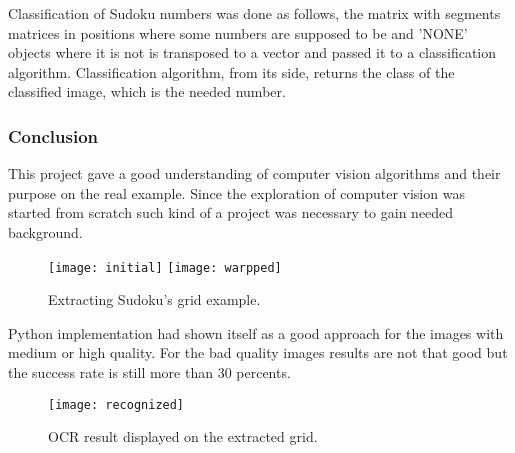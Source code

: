 \documentclass[../../main]{subfiles}
\begin{document}
Classification of Sudoku numbers was done as follows, the matrix with segments matrices in positions where some numbers are supposed to be and 'NONE' objects where it is not is transposed to a vector and passed it to a classification algorithm. Classification algorithm, from its side, returns the class of the classified image, which is the needed number.

\subsubsection{Conclusion}

This project gave a good understanding of computer vision algorithms and their purpose on the real example. Since the exploration of computer vision was started from scratch such kind of a project was necessary to gain needed background. 

\begin{figure} [ht!]
    \begin{center}
        \texttt{[image: initial]}
        \texttt{[image: warpped]}
        \caption{Extracting Sudoku's grid example.}
        \label{fig:sudoku_extraction}
    \end{center}
\end{figure}

Python implementation had shown itself as a good approach for the images with medium or high quality. For the bad quality images results are not that good but the success rate is still more than 30 percents.

\begin{figure} [ht!]
    \begin{center}
        \texttt{[image: recognized]}
        \caption{OCR result displayed on the extracted grid.}
        \label{fig:sudoku_ocr}
    \end{center}
\end{figure}
\end{document}
